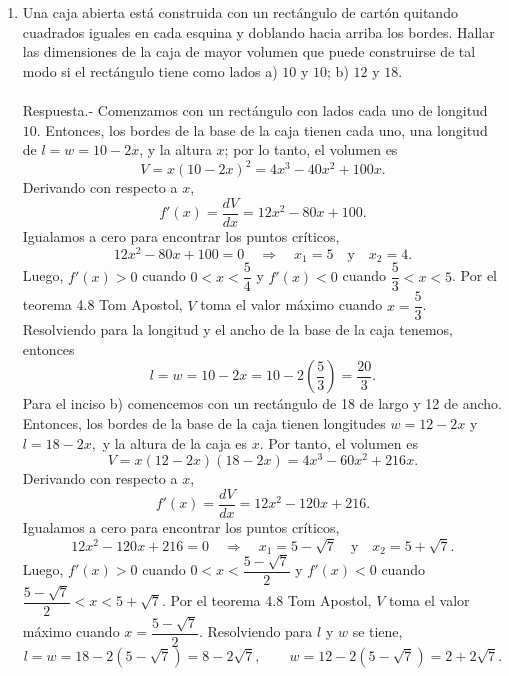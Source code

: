 \begin{enumerate}[\bfseries 1.]
    \item Una caja abierta está construida con un rectángulo de cartón quitando cuadrados iguales en cada esquina y doblando hacia arriba los bordes. Hallar las dimensiones de la caja de mayor volumen que puede construirse de tal modo si el rectángulo tiene como lados a) $10$ y $10$; b) $12$ y $18$.\\\\
	Respuesta.-\; Comenzamos con un rectángulo con lados cada uno de longitud $10$. Entonces, los bordes de la base de la caja tienen cada uno, una longitud de $l=w=10-2x$, y la altura $x$; por lo tanto, el volumen es
	$$V=x(10-2x)^2=4x^3-40x^2+100x.$$
	Derivando con respecto a $x$,
	$$f'(x)=\dfrac{dV}{dx}=12x^2-80x+100.$$
	Igualamos a cero para encontrar los puntos críticos,
	$$12x^2-80x+100=0 \quad \Rightarrow \quad x_1=5 \quad \text{y} \quad x_2=4.$$
	Luego, $f'(x)>0$ cuando $0<x<\dfrac{5}{4}$ y $f'(x)<0$ cuando $\dfrac{5}{3}<x<5$. Por el teorema 4.8 Tom Apostol, $V$ toma el valor máximo cuando $x=\dfrac{5}{3}$. Resolviendo para la longitud y el ancho de la base de la caja tenemos, entonces
	$$l=w=10-2x=10-2\left(\dfrac{5}{3}\right)=\dfrac{20}{3}.$$
	Para el inciso b) comencemos con un rectángulo de 18 de largo y 12 de ancho. Entonces, los bordes de la base de la caja tienen longitudes $w=12-2x$ y $l=18-2x,$ y la altura de la caja es $x$. Por tanto, el volumen es
	$$V=x(12-2x)(18-2x)=4x^3-60x^2+216x.$$
	Derivando con respecto a $x$,
	$$f'(x)=\dfrac{dV}{dx}=12x^2-120x+216.$$
	Igualamos a cero para encontrar los puntos críticos,
	$$12x^2-120x+216=0 \quad \Rightarrow \quad x_1=5-\sqrt{7} \quad \text{y} \quad x_2=5+\sqrt{7}.$$
	Luego, $f'(x)>0$ cuando $0<x<\dfrac{5-\sqrt{7}}{2}$ y $f'(x)<0$ cuando $\dfrac{5-\sqrt{7}}{2}<x<5+\sqrt{7}$. Por el teorema 4.8 Tom Apostol, $V$ toma el valor máximo cuando $x=\dfrac{5-\sqrt{7}}{2}$. Resolviendo para $l$ y $w$ se tiene,
	$$l=w=18-2(5-\sqrt{7})=8-2\sqrt{7}, \qquad w=12-2(5-\sqrt{7})=2+2\sqrt{7}.$$\\


\end{enumerate}
